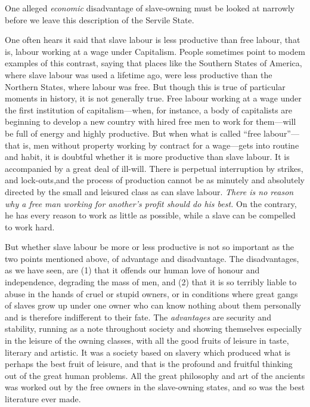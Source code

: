 \documentclass{book}
\begin{document}
One alleged \emph{economic} disadvantage of slave-owning must be looked at narrowly before we leave this description of the Servile State.

One often hears it said that slave labour is less productive than free labour, that is, labour working at a wage under Capitalism. People sometimes point to modem examples of this contrast, saying that places like the Southern States of America, where slave labour was used a lifetime ago, were less productive than the Northern States, where labour was free. But though this is true of particular moments in history, it is not generally true. Free labour working at a wage under the first institution of capitalism—when, for instance, a body of capitalists are beginning to develop a new country with hired free men to work for them—will be full of energy and highly productive. But when what is called “free labour”—that is, men without property working by contract for a wage—gets into routine and habit, it is doubtful whether it is more productive than slave labour. It is accompanied by a great deal of ill-will. There is perpetual interruption by strikes, and lock-outs,\footnotemark[1] and the process of production cannot be as minutely and absolutely directed by the small and leisured class as can slave labour. \emph{There is no reason why a free man working for another’s profit should do his best.} On the contrary, he has every reason to work as little as possible, while a slave can be compelled to work hard.

But whether slave labour be more or less productive is not so important as the two points mentioned above, of advantage and disadvantage. The disadvantages, as we have seen, are (1) that it offends our human love of honour and independence, degrading the mass of men, and (2) that it is so terribly liable to abuse in the hands of cruel or stupid owners, or in conditions where great gangs of slaves grow up under one owner who can know nothing about them personally and is therefore indifferent to their fate. The \emph{advantages} are security and stability, running as a note throughout society and showing themselves especially in the leisure of the owning classes, with all the good fruits of leisure in taste, literary and artistic. It was a society based on slavery which produced what is perhaps the best fruit of leisure, and that is the profound and fruitful thinking out of the great human problems. All the great philosophy and art of the ancients was worked out by the free owners in the slave-owning states, and so was the best literature ever made.
\end{document}
